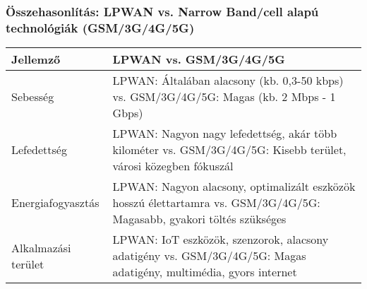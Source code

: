 \subsubsection{Összehasonlítás: LPWAN vs. Narrow Band/cell alapú technológiák (GSM/3G/4G/5G)}
\begin{table}[ht]
    \centering
    \begin{tabularx}{\textwidth}{X X}
    \toprule
    \textbf{Jellemző} & \textbf{LPWAN vs. GSM/3G/4G/5G} \\
    \midrule
    Sebesség & LPWAN: Általában alacsony (kb. 0,3-50 kbps) vs. GSM/3G/4G/5G: Magas (kb. 2 Mbps - 1 Gbps) \\
    \midrule
    Lefedettség & LPWAN: Nagyon nagy lefedettség, akár több kilométer vs. GSM/3G/4G/5G: Kisebb terület, városi közegben fókuszál \\
    \midrule
    Energiafogyasztás & LPWAN: Nagyon alacsony, optimalizált eszközök hosszú élettartamra vs. GSM/3G/4G/5G: Magasabb, gyakori töltés szükséges \\
    \midrule
    Alkalmazási terület & LPWAN: IoT eszközök, szenzorok, alacsony adatigény vs. GSM/3G/4G/5G: Magas adatigény, multimédia, gyors internet \\
    \bottomrule
    \end{tabularx}
    \label{table:lpwan_vs_cellular}
\end{table}

\clearpage
